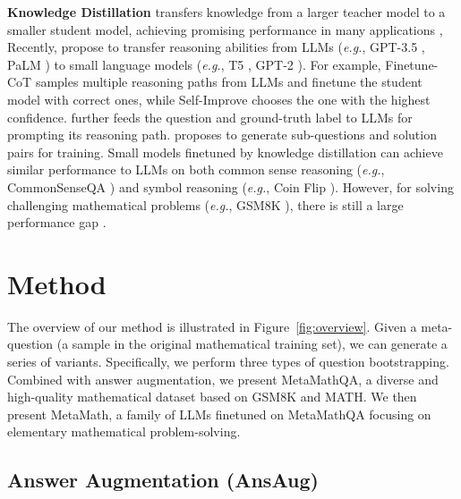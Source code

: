     \textbf{Knowledge Distillation} \citep{hinton2015distilling, gou2021knowledge} transfers knowledge from a larger teacher model to a smaller student model, achieving promising performance in many applications \citep{shen2018feature, park2019relational, he2019knowledge, mirzadeh2020improved}, Recently, \citep{li2022explanations, huang2022large, ho2023large, magister2023teaching, hsieh2023distilling, fu23d, shridhar2023distilling} propose to transfer reasoning abilities from LLMs (\emph{e.g.}, GPT-3.5 \citep{gpt3-5}, PaLM \citep{chowdhery2022palm}) to small language models (\emph{e.g.}, T5 \citep{Colin2020t5}, GPT-2 \citep{gpt2}). For example, Finetune-CoT \citep{ho2023large} samples multiple reasoning paths from LLMs and  finetune the student model with correct ones, while Self-Improve \citep{huang2022large} chooses the one with the highest confidence.
    \citet{li2022explanations} further feeds the question and ground-truth label to LLMs for prompting its reasoning path.
    \citet{shridhar2023distilling} proposes to generate sub-questions and solution pairs for training. Small models finetuned by knowledge distillation can achieve similar performance to LLMs \citep{magister2023teaching, ho2023large} on both common sense reasoning (\emph{e.g.}, CommonSenseQA \citep{talmor2019commonsenseqa}) and symbol reasoning (\emph{e.g.}, Coin Flip \citep{wei2022chain}). However, for solving challenging mathematical problems (\emph{e.g.}, GSM8K \citep{cobbe2021training}), there is still a large performance gap  \citep{ho2023large, fu23d, magister2023teaching}.

    \section{Method}	\label{sec:method}

The overview of our method is illustrated in Figure~\ref{fig:overview}. Given a meta-question (a sample in the original mathematical training set), we can generate a series of variants. Specifically, we perform three types of question bootstrapping. Combined with answer augmentation, we present {MetaMathQA}, a diverse and high-quality mathematical dataset based on GSM8K and MATH. We then present {MetaMath}, a family of LLMs finetuned on MetaMathQA focusing on elementary mathematical problem-solving. 

\subsection{Answer Augmentation (AnsAug)}

